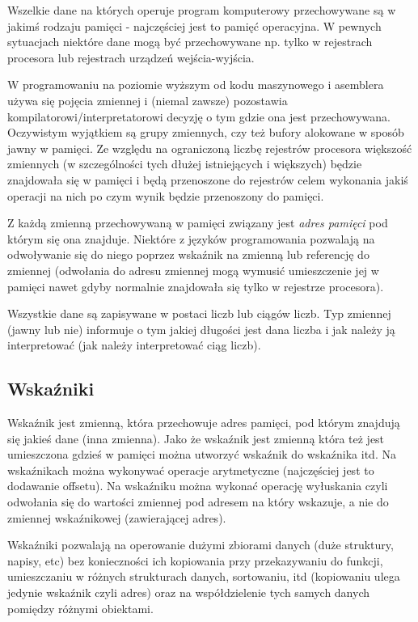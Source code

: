 \documentclass{pdfBooklets}
\begin{document}
Wszelkie dane na których operuje program komputerowy przechowywane są w jakimś rodzaju pamięci - najczęściej jest to pamięć operacyjna. W pewnych sytuacjach niektóre dane mogą być przechowywane np. tylko w rejestrach procesora lub rejestrach urządzeń wejścia-wyjścia.

W programowaniu na poziomie wyższym od kodu maszynowego i asemblera używa się pojęcia zmiennej i (niemal zawsze) pozostawia kompilatorowi/interpretatorowi decyzję o tym gdzie ona jest przechowywana. Oczywistym wyjątkiem są grupy zmiennych, czy też bufory alokowane w sposób jawny w pamięci. Ze względu na ograniczoną liczbę rejestrów procesora większość zmiennych (w szczególności tych dłużej istniejących i większych) będzie znajdowała się w pamięci i będą przenoszone do rejestrów celem wykonania jakiś operacji na nich po czym wynik będzie przenoszony do pamięci.

Z każdą zmienną przechowywaną w pamięci związany jest \emph{adres pamięci} pod którym się ona znajduje. Niektóre z języków programowania pozwalają na odwoływanie się do niego poprzez wskaźnik na zmienną lub referencję do zmiennej (odwołania do adresu zmiennej mogą wymusić umieszczenie jej w pamięci nawet gdyby normalnie znajdowała się tylko w rejestrze procesora).

Wszystkie dane są zapisywane w postaci liczb lub ciągów liczb. Typ zmiennej (jawny lub nie) informuje o tym jakiej długości jest dana liczba i jak należy ją interpretować (jak należy interpretować ciąg liczb). 

\subsection{Wskaźniki}
Wskaźnik jest zmienną, która przechowuje adres pamięci, pod którym znajdują się jakieś dane (inna zmienna). Jako że wskaźnik jest zmienną która też jest umieszczona gdzieś w pamięci można utworzyć wskaźnik do wskaźnika itd. Na wskaźnikach można wykonywać operacje arytmetyczne (najczęściej jest to dodawanie offsetu). Na wskaźniku można wykonać operację wyłuskania czyli odwołania się do wartości zmiennej pod adresem na który wskazuje, a nie do zmiennej wskaźnikowej (zawierającej adres).

Wskaźniki pozwalają na operowanie dużymi zbiorami danych (duże struktury, napisy, etc) bez konieczności ich kopiowania przy przekazywaniu do funkcji, umieszczaniu w różnych strukturach danych, sortowaniu, itd (kopiowaniu ulega jedynie wskaźnik czyli adres) oraz na współdzielenie tych samych danych pomiędzy różnymi obiektami.
\end{document}
